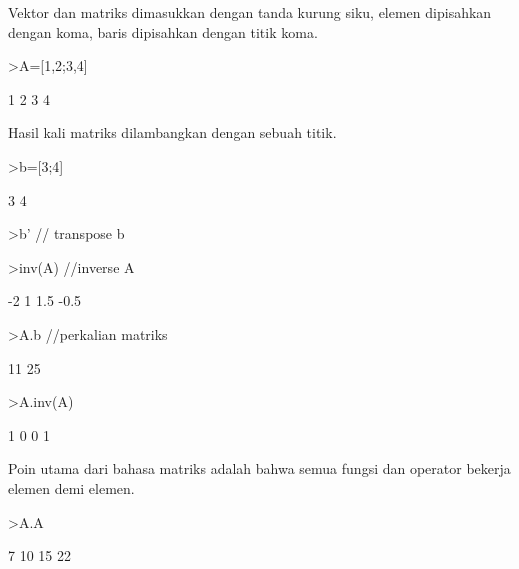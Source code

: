 \documentclass[a4paper,10pt]{article}
\begin{document}
\begin{eulernotebook}
\begin{eulercomment}
\begin{eulercomment}
\begin{eulercomment}
\begin{eulercomment}
\begin{eulercomment}
Vektor dan matriks dimasukkan dengan tanda kurung siku, elemen
dipisahkan dengan koma, baris dipisahkan dengan titik koma.
\end{eulercomment}
\begin{eulerprompt}
>A=[1,2;3,4]
\end{eulerprompt}
\begin{euleroutput}
              1             2 
              3             4 
\end{euleroutput}
\begin{eulercomment}
Hasil kali matriks dilambangkan dengan sebuah titik.
\end{eulercomment}
\begin{eulerprompt}
>b=[3;4]
\end{eulerprompt}
\begin{euleroutput}
              3 
              4 
\end{euleroutput}
\begin{eulerprompt}
>b' // transpose b
\end{eulerprompt}
\begin{euleroutput}
  [3,  4]
\end{euleroutput}
\begin{eulerprompt}
>inv(A) //inverse A
\end{eulerprompt}
\begin{euleroutput}
             -2             1 
            1.5          -0.5 
\end{euleroutput}
\begin{eulerprompt}
>A.b //perkalian matriks
\end{eulerprompt}
\begin{euleroutput}
             11 
             25 
\end{euleroutput}
\begin{eulerprompt}
>A.inv(A)
\end{eulerprompt}
\begin{euleroutput}
              1             0 
              0             1 
\end{euleroutput}
\begin{eulercomment}
Poin utama dari bahasa matriks adalah bahwa semua fungsi dan operator
bekerja elemen demi elemen.
\end{eulercomment}
\begin{eulerprompt}
>A.A
\end{eulerprompt}
\begin{euleroutput}
              7            10 
             15            22 
\end{euleroutput}

\end{eulercomment}
\end{eulercomment}
\end{eulercomment}
\end{eulercomment}
\end{eulernotebook}
\end{document}
